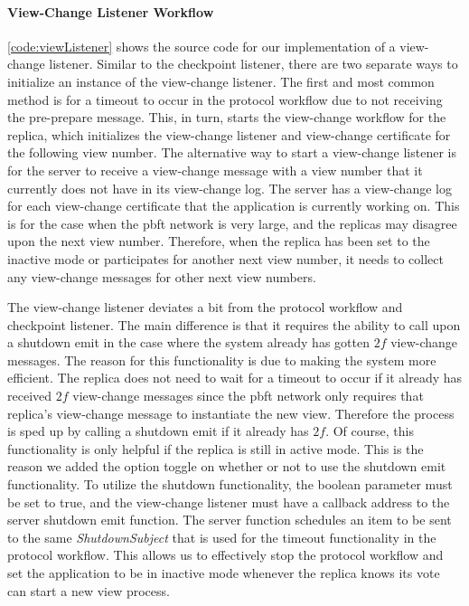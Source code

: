 \paragraph{View-Change Listener Workflow}
\label{sec:viewchangeListener}
\autoref{code:viewListener} shows the source code for our implementation of a view-change listener. Similar to the checkpoint listener, there are two separate ways to initialize an instance of the view-change listener. The first and most common method is for a timeout to occur in the protocol workflow due to not receiving the pre-prepare message. This, in turn, starts the view-change workflow for the replica, which initializes the view-change listener and view-change certificate for the following view number. The alternative way to start a view-change listener is for the server to receive a view-change message with a view number that it currently does not have in its view-change log. The server has a view-change log for each view-change certificate that the application is currently working on. This is for the case when the \ac{pbft} network is very large, and the replicas may disagree upon the next view number. Therefore, when the replica has been set to the inactive mode or participates for another next view number, it needs to collect any view-change messages for other next view numbers.

The view-change listener deviates a bit from the protocol workflow and checkpoint listener. The main difference is that it requires the ability to call upon a shutdown emit in the case where the system already has gotten $2f$ view-change messages. The reason for this functionality is due to making the system more efficient. The replica does not need to wait for a timeout to occur if it already has received $2f$ view-change messages since the \ac{pbft} network only requires that replica’s view-change message to instantiate the new view. Therefore the process is sped up by calling a shutdown emit if it already has $2f$. Of course, this functionality is only helpful if the replica is still in active mode. This is the reason we added the option toggle on whether or not to use the shutdown emit functionality. To utilize the shutdown functionality, the boolean parameter  must be set to true, and the view-change listener must have a callback address to the server shutdown emit function. The server function schedules an item to be sent to the same  \emph{ShutdownSubject} that is used for the timeout functionality in the protocol workflow. This allows us to effectively stop the protocol workflow and set the application to be in inactive mode whenever the replica knows its vote can start a new view process. 

